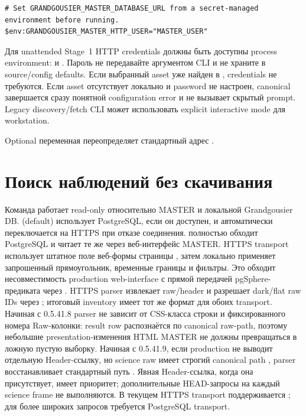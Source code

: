 \begin{lstlisting}
# Set GRANDGOUSIER_MASTER_DATABASE_URL from a secret-managed environment before running.
$env:GRANDGOUSIER_MASTER_HTTP_USER="MASTER_USER"
\end{lstlisting}

Для unattended Stage~1 HTTP credentials должны быть доступны process environment:  и . Пароль не передавайте аргументом CLI и не храните в source/config defaults. Если выбранный asset уже найден в , credentials не требуются. Если asset отсутствует локально и password не настроен, canonical  завершается сразу понятной configuration error и не вызывает скрытый prompt. Legacy discovery/fetch CLI может использовать explicit interactive mode для workstation.

Optional переменная  переопределяет стандартный адрес .

\section{Поиск наблюдений без скачивания}

Команда  работает read-only относительно MASTER и локальной Grandgousier DB.  (default) использует PostgreSQL, если он доступен, и автоматически переключается на HTTPS при отказе соединения.  полностью обходит PostgreSQL и читает те же  через веб-интерфейс MASTER. HTTPS transport использует штатное поле веб-формы  страницы , затем локально применяет запрошенный прямоугольник, временные границы и фильтры. Это обходит несовместимость production web-interface с прямой передачей pgSphere-предиката через . HTTPS parser извлекает raw/header и разрешает dark/flat raw IDs через ; итоговый inventory имеет тот же формат для обоих transport. Начиная с 0.5.41.8 parser не зависит от CSS-класса строки и фиксированного номера Raw-колонки: result row распознаётся по canonical raw-path, поэтому небольшие presentation-изменения HTML MASTER не должны превращаться в ложную пустую выборку. Начиная с 0.5.41.9, если production  не выводит отдельную Header-ссылку, но science raw имеет строгий canonical path , parser восстанавливает стандартный путь . Явная Header-ссылка, когда она присутствует, имеет приоритет; дополнительные HEAD-запросы на каждый science frame не выполняются. В текущем HTTPS transport поддерживается ; для более широких запросов требуется PostgreSQL transport.

